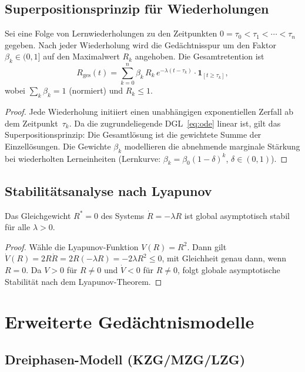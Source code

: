 ﻿\documentclass[12pt,a4paper,twoside]{article}
\theoremstyle{theormstyle}
\theoremstyle{proofstyle}
\begin{document}
	\subsection{Superpositionsprinzip für Wiederholungen}
	
		Sei eine Folge von Lernwiederholungen zu den Zeitpunkten
		$0 = \tau_0 < \tau_1 < \cdots < \tau_n$ gegeben.
		Nach jeder Wiederholung wird die Gedächtnisspur um den Faktor $\beta_k \in (0,1]$
		auf den Maximalwert $R_k$ angehoben. Die Gesamtretention ist
		\[
		R_{\mathrm{ges}}(t) = \sum_{k=0}^{n} \beta_k\,R_k\,e^{-\lambda(t-\tau_k)}
		\cdot \mathbf{1}_{[t \geq \tau_k]},
		\]
		wobei $\sum_k \beta_k = 1$ (normiert) und $R_k \leq 1$.
	
	\begin{proof}
		Jede Wiederholung initiiert einen unabhängigen exponentiellen Zerfall
		ab dem Zeitpunkt~$\tau_k$. Da die zugrundeliegende DGL~\eqref{eq:ode}
		linear ist, gilt das Superpositionsprinzip: Die Gesamtlösung ist die gewichtete
		Summe der Einzellösungen. Die Gewichte $\beta_k$ modellieren die abnehmende
		marginale Stärkung bei wiederholten Lerneinheiten
		(Lernkurve: $\beta_k = \beta_0(1-\delta)^k$, $\delta \in (0,1)$).
	\end{proof}
	
	\subsection{Stabilitätsanalyse nach Lyapunov}
	
		Das Gleichgewicht $R^* = 0$ des Systems $\dot{R} = -\lambda R$ ist
		global asymptotisch stabil für alle $\lambda > 0$.
	
	\begin{proof}
		Wähle die Lyapunov-Funktion $V(R) = R^2$. Dann gilt
		$\dot{V}(R) = 2R\dot{R} = 2R(-\lambda R) = -2\lambda R^2 \leq 0$,
		mit Gleichheit genau dann, wenn $R = 0$.
		Da $V > 0$ für $R \neq 0$ und $\dot{V} < 0$ für $R \neq 0$,
		folgt globale asymptotische Stabilität nach dem Lyapunov-Theorem.
	\end{proof}
	
	\section{Erweiterte Gedächtnismodelle}
	\label{sec:modelle}
	
	\subsection{Dreiphasen-Modell (KZG/MZG/LZG)}
	
\end{document}
